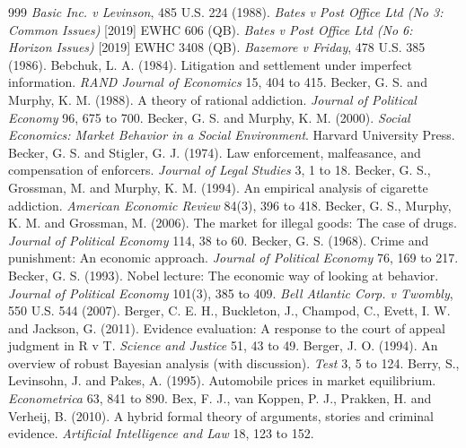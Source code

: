 \begin{thebibliography}{999}
 \emph{Basic Inc. v Levinson}, 485 U.S. 224 (1988).
 \emph{Bates v Post Office Ltd (No 3: Common Issues)} [2019] EWHC 606 (QB).
 \emph{Bates v Post Office Ltd (No 6: Horizon Issues)} [2019] EWHC 3408 (QB).
 \emph{Bazemore v Friday}, 478 U.S. 385 (1986).
 Bebchuk, L. A. (1984). Litigation and settlement under imperfect information. \emph{RAND Journal of Economics} 15, 404 to 415.
 Becker, G. S. and Murphy, K. M. (1988). A theory of rational addiction. \emph{Journal of Political Economy} 96, 675 to 700.
 Becker, G. S. and Murphy, K. M. (2000). \emph{Social Economics: Market Behavior in a Social Environment}. Harvard University Press.
 Becker, G. S. and Stigler, G. J. (1974). Law enforcement, malfeasance, and compensation of enforcers. \emph{Journal of Legal Studies} 3, 1 to 18.
 Becker, G. S., Grossman, M. and Murphy, K. M. (1994). An empirical analysis of cigarette addiction. \emph{American Economic Review} 84(3), 396 to 418.
 Becker, G. S., Murphy, K. M. and Grossman, M. (2006). The market for illegal goods: The case of drugs. \emph{Journal of Political Economy} 114, 38 to 60.
 Becker, G. S. (1968). Crime and punishment: An economic approach. \emph{Journal of Political Economy} 76, 169 to 217.
 Becker, G. S. (1993). Nobel lecture: The economic way of looking at behavior. \emph{Journal of Political Economy} 101(3), 385 to 409.
 \emph{Bell Atlantic Corp. v Twombly}, 550 U.S. 544 (2007).
 Berger, C. E. H., Buckleton, J., Champod, C., Evett, I. W. and Jackson, G. (2011). Evidence evaluation: A response to the court of appeal judgment in R v T. \emph{Science and Justice} 51, 43 to 49.
 Berger, J. O. (1994). An overview of robust Bayesian analysis (with discussion). \emph{Test} 3, 5 to 124.
 Berry, S., Levinsohn, J. and Pakes, A. (1995). Automobile prices in market equilibrium. \emph{Econometrica} 63, 841 to 890.
 Bex, F. J., van Koppen, P. J., Prakken, H. and Verheij, B. (2010). A hybrid formal theory of arguments, stories and criminal evidence. \emph{Artificial Intelligence and Law} 18, 123 to 152.

\end{thebibliography}
